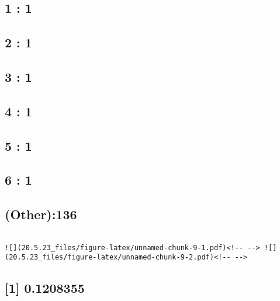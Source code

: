 \documentclass[
]{article}
\begin{document}
\hypertarget{section-34}{%
\subsection{1 : 1}\label{section-34}}

\hypertarget{section-35}{%
\subsection{2 : 1}\label{section-35}}

\hypertarget{section-36}{%
\subsection{3 : 1}\label{section-36}}

\hypertarget{section-37}{%
\subsection{4 : 1}\label{section-37}}

\hypertarget{section-38}{%
\subsection{5 : 1}\label{section-38}}

\hypertarget{section-39}{%
\subsection{6 : 1}\label{section-39}}

\hypertarget{other136}{%
\subsection{(Other):136}\label{other136}}

\begin{verbatim}

![](20.5.23_files/figure-latex/unnamed-chunk-9-1.pdf)<!-- --> ![](20.5.23_files/figure-latex/unnamed-chunk-9-2.pdf)<!-- --> 
\end{verbatim}

\hypertarget{section-40}{%
\subsection{{[}1{]} 0.1208355}\label{section-40}}

\begin{verbatim}
\end{verbatim}
\end{document}

